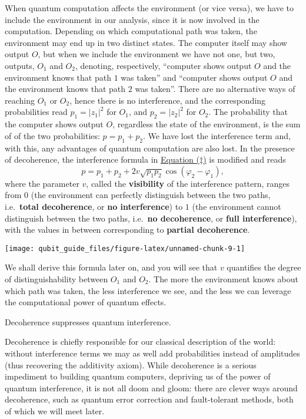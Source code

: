 \documentclass[fleqn]{article}
\newenvironment{idea}{\noindent}{\medskip}
\begin{document}
When quantum computation affects the environment (or vice versa), we have to include the environment in our analysis, since it is now involved in the computation.
Depending on which computational path was taken, the environment may end up in two distinct states.
The computer itself may show output \(O\), but when we include the environment we have not one, but two, outputs, \(O_1\) and \(O_2\), denoting, respectively, ``computer shows output \(O\) and the environment knows that path \(1\) was taken'' and ``computer shows output \(O\) and the environment knows that path \(2\) was taken''.
There are no alternative ways of reaching \(O_1\) or \(O_2\), hence there is no interference, and the corresponding probabilities read \(p_1=|z_1|^2\) for \(O_1\), and \(p_2=|z_2|^2\) for \(O_2\).
The probability that the computer shows output \(O\), regardless the state of the environment, is the sum of of the two probabilities: \(p=p_1+p_2\).
We have lost the interference term and, with this, any advantages of quantum computation are also lost.
In the presence of decoherence, the interference formula in \protect\hyperlink{the-double-slit-experiment}{Equation (\(\ddagger\))} is modified and reads
\[
p = p_1 + p_2 + 2 v \sqrt{p_1 p_2}\cos (\varphi_2-\varphi_1),
\]
where the parameter \(v\), called the \textbf{visibility} of the interference pattern, ranges from \(0\) (the environment can perfectly distinguish between the two paths, i.e.~\textbf{total decoherence}, or \textbf{no interference}) to \(1\) (the environment cannot distinguish between the two paths, i.e.~\textbf{no decoherence}, or \textbf{full interference}), with the values in between corresponding to \textbf{partial decoherence}.

\begin{center}\texttt{[image: qubit\_guide\_files/figure-latex/unnamed-chunk-9-1]} \end{center}

We shall derive this formula later on, and you will see that \(v\) quantifies the degree of distinguishability between \(O_1\) and \(O_2\).
The more the environment knows about which path was taken, the less interference we see, and the less we can leverage the computational power of quantum effects.

\begin{idea}
Decoherence suppresses quantum interference.

\end{idea}

Decoherence is chiefly responsible for our classical description of the world: without interference terms we may as well add probabilities instead of amplitudes (thus recovering the additivity axiom).
While decoherence is a serious impediment to building quantum computers, depriving us of the power of quantum interference, it is not all doom and gloom: there are clever ways around decoherence, such as quantum error correction and fault-tolerant methods, both of which we will meet later.
\end{document}
